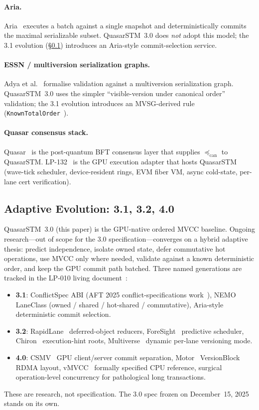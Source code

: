 \paragraph{Aria.}
Aria~\cite{lu2020aria} executes a batch against a single snapshot
and deterministically commits the maximal serializable subset.
QuasarSTM~3.0 does \emph{not} adopt this model; the 3.1 evolution
(\S\ref{sec:adaptive}) introduces an Aria-style commit-selection
service.

\paragraph{ESSN / multiversion serialization graphs.}
Adya et al.~\cite{adya2000essn} formalise validation against a
multiversion serialization graph. QuasarSTM~3.0 uses the simpler
``visible-version under canonical order'' validation; the 3.1
evolution introduces an MVSG-derived rule
(\texttt{KnownTotalOrder}~\cite{lp010-quasarstm}).

\paragraph{Quasar consensus stack.}
Quasar~\cite{quasar2025} is the post-quantum BFT consensus layer that
supplies $\preceq_{\mathrm{can}}$ to QuasarSTM.
LP-132~\cite{lp132-quasarexec} is the GPU execution adapter that
hosts QuasarSTM (wave-tick scheduler, device-resident rings, EVM
fiber VM, async cold-state, per-lane cert verification).

\subsection{Adaptive Evolution: 3.1, 3.2, 4.0}
\label{sec:adaptive}

QuasarSTM~3.0 (this paper) is the GPU-native ordered MVCC baseline.
Ongoing research---out of scope for the 3.0 specification---converges
on a hybrid adaptive thesis: predict independence, isolate owned
state, defer commutative hot operations, use MVCC only where needed,
validate against a known deterministic order, and keep the GPU
commit path batched. Three named generations are tracked in the
LP-010 living document~\cite{lp010-quasarstm}:

\begin{itemize}[leftmargin=2em]
\item \textbf{3.1}: ConflictSpec ABI (AFT 2025
      conflict-specifications work~\cite{aft2025conflictspec}),
      NEMO~\cite{nemo2025} LaneClass (owned / shared / hot-shared /
      commutative), Aria-style deterministic commit selection.
\item \textbf{3.2}: RapidLane~\cite{rapidlane2025} deferred-object
      reducers, ForeSight~\cite{foresight2025} predictive scheduler,
      Chiron~\cite{chiron2025} execution-hint roots,
      Multiverse~\cite{multiverse2026} dynamic per-lane versioning
      mode.
\item \textbf{4.0}: CSMV~\cite{csmv} GPU client/server commit
      separation, Motor~\cite{motor2024} VersionBlock RDMA layout,
      vMVCC~\cite{vmvcc} formally specified CPU reference, surgical
      operation-level concurrency for pathological long
      transactions.
\end{itemize}

These are research, not specification. The 3.0 spec frozen on
December~15, 2025 stands on its own.


